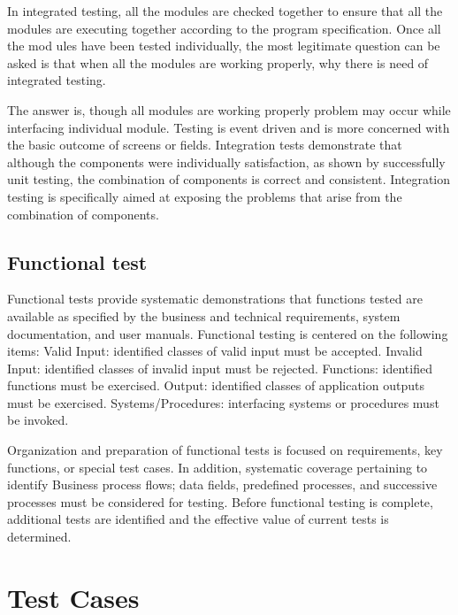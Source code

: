 \documentclass[12pt]{report}
\begin{document}
In integrated testing, all the modules are checked together to ensure that all the modules are 
executing together according to the program specification. Once all the mod ules have been 
tested individually, the most legitimate question can be asked is that when all the modules 
are working properly, why there is need of integrated testing.

The answer is, though all modules are working properly problem may occur while interfacing 
individual module. Testing is event driven and is more concerned with the 
basic outcome of screens or fields. Integration tests demonstrate that although the components 
were individually satisfaction, as shown by successfully unit testing, the combination of 
components is correct and consistent. Integration testing is specifically aimed at exposing the 
problems that arise from the combination of components.

\subsection{ Functional test}
\justifying
\setlength{\parindent}{4em}
\setlength{\parskip}{0.5em}
\renewcommand{\baselinestretch}{1.5}
\normalsize

Functional tests provide systematic demonstrations that functions tested are available as 
specified by the business and technical requirements, system documentation, and user 
manuals. Functional testing is centered on the following items: Valid Input: identified classes 
of valid input must be accepted. Invalid Input: identified classes of invalid input must be 
rejected. Functions: identified functions must be exercised. Output: identified classes of 
application outputs must be exercised. Systems/Procedures: interfacing systems or procedures 
must be invoked.

Organization and preparation of functional tests is focused on requirements, key functions, or 
special test cases. In addition, systematic coverage pertaining to identify Business process 
flows; data fields, predefined processes, and successive processes must be considered for 
testing. Before functional testing is complete, additional tests are identified and the effective 
value of current tests is determined.




\clearpage


\centering
\section{Test Cases}
\end{document}
